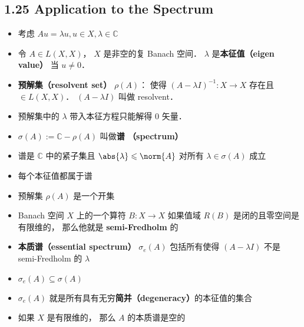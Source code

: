 \subsection{1.25 Application to the Spectrum}
\begin{itemize}
\item 考虑 $Au = \lambda u, u \in X, \lambda \in \mathbb C$

\item 令 $A\in L(X,X)$， $X$ 是非空的复 Banach 空间．  $\lambda$ 是\textbf{本征值（eigen value）} 当 $u\ne 0$．

\item \textbf{预解集（resolvent set）} $\rho(A)$： 使得 $(A-\lambda I)^{-1}: X \to X$ 存在且 $\in L(X,X)$． $(A-\lambda I)$ 叫做 resolvent．

\item 预解集中的 $\lambda$ 带入本征方程只能解得 0 矢量．

\item $\sigma(A) := \mathbb C - \rho(A)$ 叫做\textbf{谱 （spectrum）}

\item 谱是 $\mathbb C$ 中的紧子集且 $\abs{\lambda} \leqslant \norm{A}$ 对所有 $\lambda\in\sigma(A)$ 成立

\item 每个本征值都属于谱

\item 预解集 $\rho(A)$ 是一个开集

\item Banach 空间 $X$ 上的一个算符 $B: X\to X$ 如果值域 $R(B)$ 是闭的且零空间是有限维的， 那么他就是 \textbf{semi-Fredholm} 的

\item \textbf{本质谱（essential spectrum）} $\sigma_e(A)$ 包括所有使得 $(A - \lambda I)$ 不是 semi-Fredholm 的 $\lambda$
\item $\sigma_e(A) \subseteq \sigma(A)$
\item $\sigma_e(A)$ 就是所有具有无穷\textbf{简并（degeneracy）}的本征值的集合
\item 如果 $X$ 是有限维的， 那么 $A$ 的本质谱是空的 
\end{itemize}

